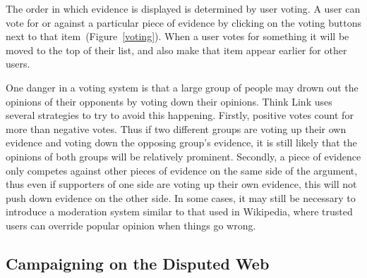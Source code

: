 \documentclass{chi2009}
\newcommand{\todo}[1]{}
\begin{document}
The order in which evidence is displayed is determined by user voting. A user can vote for or against a particular piece of evidence by clicking on the voting buttons next to that item~(Figure~\ref{voting}). When a user votes for something it will be moved to the top of their list, and also make that item appear earlier for other users.

One danger in a voting system is that a large group of people may drown out the opinions of their opponents by voting down their opinions. Think Link uses several strategies to try to avoid this happening. Firstly, positive votes count for more than negative votes. Thus if two different groups are voting up their own evidence and voting down the opposing group's evidence, it is still likely that the opinions of both groups will be relatively prominent. Secondly, a piece of evidence only competes against other pieces of evidence on the same side of the argument, thus even if supporters of one side are voting up their own evidence, this will not push down evidence on the other side. In some cases, it may still be necessary to introduce a moderation system similar to that used in Wikipedia, where trusted users can override popular opinion when things go wrong. 
\todo{Talk about whether we know if this works}

\todo{Talk about searches}
\todo{Cite work on collaborative filtering}
\todo{Mention the sidebar?}


\subsection{Campaigning on the Disputed Web}
\end{document}
